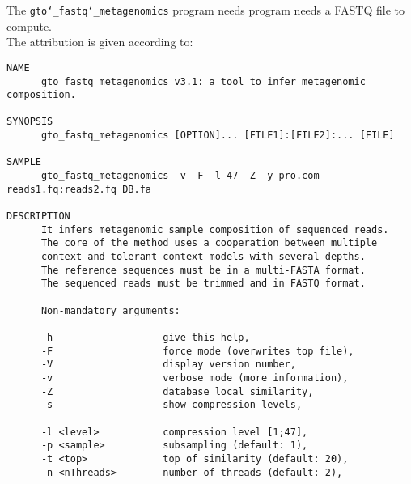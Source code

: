 The \texttt{gto\char`_fastq\char`_metagenomics} program needs program needs a FASTQ file to compute.\\
The attribution is given according to:
\begin{lstlisting}
NAME                                                                     
      gto_fastq_metagenomics v3.1: a tool to infer metagenomic composition.            
                                                                         
SYNOPSIS                                                                 
      gto_fastq_metagenomics [OPTION]... [FILE1]:[FILE2]:... [FILE]                      
                                                                         
SAMPLE                                                                   
      gto_fastq_metagenomics -v -F -l 47 -Z -y pro.com reads1.fq:reads2.fq DB.fa         
                                                                         
DESCRIPTION                                                              
      It infers metagenomic sample composition of sequenced reads.       
      The core of the method uses a cooperation between multiple         
      context and tolerant context models with several depths.           
      The reference sequences must be in a multi-FASTA format.           
      The sequenced reads must be trimmed and in FASTQ format.           
                                                                         
      Non-mandatory arguments:                                           
                                                                         
      -h                   give this help,                               
      -F                   force mode (overwrites top file),             
      -V                   display version number,                       
      -v                   verbose mode (more information),              
      -Z                   database local similarity,                    
      -s                   show compression levels,                      
                                                                         
      -l <level>           compression level [1;47],                    
      -p <sample>          subsampling (default: 1),                    
      -t <top>             top of similarity (default: 20),              
      -n <nThreads>        number of threads (default: 2),              
                                                                         

\end{lstlisting}
